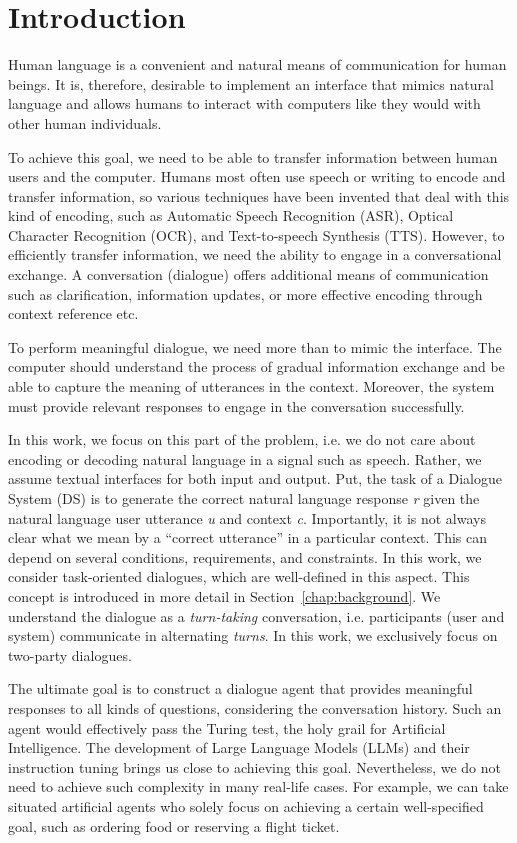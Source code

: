 \chapter{Introduction}%
\label{chap:intro}
Human language is a convenient and natural means of communication for human beings.
It is, therefore, desirable to implement an interface that mimics natural language and allows humans to interact with computers like they would with other human individuals.

To achieve this goal, we need to be able to transfer information between human users and the computer.
Humans most often use speech or writing to encode and transfer information, so various techniques have been invented that deal with this kind of encoding, such as Automatic Speech Recognition (ASR), Optical Character Recognition (OCR), and Text-to-speech Synthesis (TTS).
However, to efficiently transfer information, we need the ability to engage in a conversational exchange.
A conversation (dialogue) offers additional means of communication such as clarification, information updates, or more effective encoding through context reference etc.

To perform meaningful dialogue, we need more than to mimic the interface.
The computer should understand the process of gradual information exchange and be able to capture the meaning of utterances in the context.
Moreover, the system must provide relevant responses to engage in the conversation successfully.

In this work, we focus on this part of the problem, i.e. we do not care about encoding or decoding natural language in a signal such as speech.
Rather, we assume textual interfaces for both input and output.
Put, the task of a Dialogue System (DS) is to generate the correct natural language response \textit{r} given the natural language user utterance \textit{u} and context \textit{c}.
Importantly, it is not always clear what we mean by a ``correct utterance'' in a particular context.
This can depend on several conditions, requirements, and constraints.
In this work, we consider task-oriented dialogues, which are well-defined in this aspect.
This concept is introduced in more detail in Section~\ref{chap:background}.
We understand the dialogue as a \textit{turn-taking} conversation, i.e. participants (user and system) communicate in alternating \textit{turns}.
In this work, we exclusively focus on two-party dialogues.

The ultimate goal is to construct a dialogue agent that provides meaningful responses to all kinds of questions, considering the conversation history.
Such an agent would effectively pass the Turing test, the holy grail for Artificial Intelligence.
The development of Large Language Models (LLMs) and their instruction tuning brings us close to achieving this goal.
Nevertheless, we do not need to achieve such complexity in many real-life cases.
For example, we can take situated artificial agents who solely focus on achieving a certain well-specified goal, such as ordering food or reserving a flight ticket.

